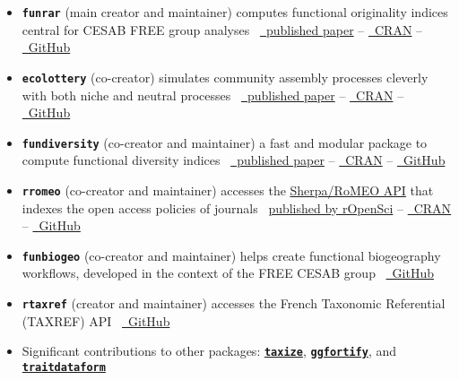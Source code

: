 \documentclass[10pt,a4paper,]{article}
\begin{document}
\begin{itemize}
\item
  \textbf{\texttt{funrar}} (main creator and maintainer)
  \hfill\break computes functional originality indices central for CESAB
  FREE group analyses
  \hfill\break ~\href{https://doi.org/10.1111/ddi.12629}{\faFile*~published
  paper} --
  \href{https://cran.r-project.org/package=funrar}{\faRProject~CRAN} --
  \href{https://github.com/Rekyt/funrar}{\faGithub~GitHub}
\item
  \textbf{\texttt{ecolottery}} (co-creator) \hfill\break simulates
  community assembly processes cleverly with both niche and neutral
  processes
  \hfill\break ~\href{https://doi.org/10.1111/2041-210X.12918}{\faFile*~published
  paper} --
  \href{https://cran.r-project.org/package=ecolottery}{\faRProject~CRAN}
  -- \href{https://github.com/frmunoz/ecolottery}{\faGithub~GitHub}
\item
  \textbf{\texttt{fundiversity}} (co-creator and maintainer)
  \hfill\break a fast and modular package to compute functional
  diversity indices
  \hfill\break ~\href{https:////doi.org/10.1111/ecog.06585}{\faFile*~published
  paper} --
  \href{https://cran.r-project.org/package=fundiversity}{\faRProject~CRAN}
  -- \href{https://github.com/bisaloo/fundiversity}{\faGithub~GitHub}
\item
  \textbf{\texttt{rromeo}} (co-creator and maintainer)
  \hfill\break accesses the
  \href{https://v2.sherpa.ac.uk/romeo/}{Sherpa/RoMEO API} that indexes
  the open access policies of journals
  \hfill\break~\href{https://docs.ropensci.org/rromeo}{published by
  rOpenSci} --
  \href{https://cran.r-project.org/package=rromeo}{\faRProject~CRAN} --
  \href{https://github.com/ropensci/rromeo}{\faGithub~GitHub}
\item
  \textbf{\texttt{funbiogeo}} (co-creator and maintainer)
  \hfill\break helps create functional biogeography workflows, developed
  in the context of the FREE CESAB group
  \hfill\break ~\href{https://github.com/FRBCesab/funbiogeo}{\faGithub~GitHub}
\item
  \textbf{\texttt{rtaxref}} (creator and maintainer)
  \hfill\break accesses the French Taxonomic Referential (TAXREF) API
  \hfill\break ~\href{https://github.com/Rekyt/rtaxref}{\faGithub~GitHub}
\item
  Significant contributions to other packages:
  \href{https://cran.r-project.org/package=taxize}{\textbf{\texttt{taxize}}},
  \href{https://cran.r-project.org/package=ggfortify}{\textbf{\texttt{ggfortify}}},
  and
  \href{https://cran.r-project.org/package=traitdataform}{\textbf{\texttt{traitdataform}}}
\end{itemize}
\end{document}

